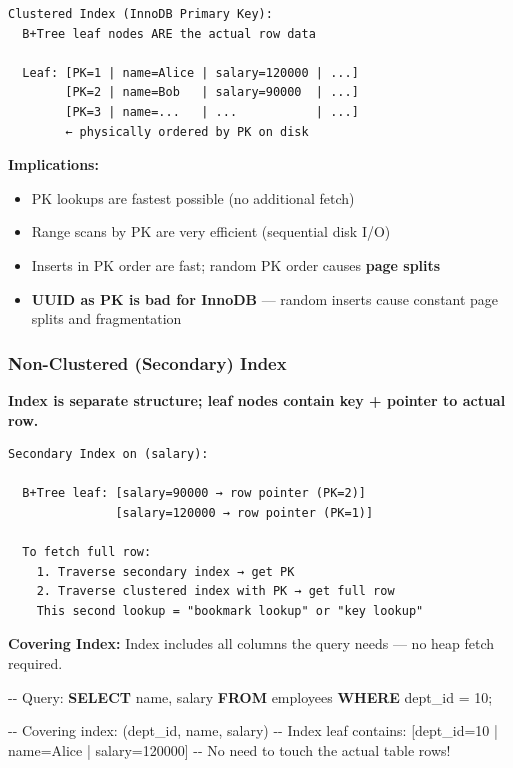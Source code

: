 \documentclass[11pt]{article}
\providecommand{\tightlist}{\setlength{\itemsep}{1pt}\setlength{\parskip}{0pt}}
\newenvironment{Shaded}{\begin{snugshade}}{\end{snugshade}}
\newcommand{\CommentTok}[1]{\textcolor[rgb]{0.48,0.49,0.49}{#1}}
\newcommand{\DecValTok}[1]{\textcolor[rgb]{0.96,0.45,0.00}{#1}}
\newcommand{\KeywordTok}[1]{\textcolor[rgb]{0.81,0.81,0.76}{\textbf{#1}}}
\newcommand{\NormalTok}[1]{\textcolor[rgb]{0.81,0.81,0.76}{#1}}
\newcommand{\OperatorTok}[1]{\textcolor[rgb]{0.81,0.81,0.76}{#1}}
\begin{document}
\setcodelang{}

\begin{verbatim}
Clustered Index (InnoDB Primary Key):
  B+Tree leaf nodes ARE the actual row data

  Leaf: [PK=1 | name=Alice | salary=120000 | ...]
        [PK=2 | name=Bob   | salary=90000  | ...]
        [PK=3 | name=...   | ...           | ...]
        ← physically ordered by PK on disk
\end{verbatim}

\textbf{Implications:}

\begin{itemize}
\tightlist
\item
  PK lookups are fastest possible (no additional fetch)
\item
  Range scans by PK are very efficient (sequential disk I/O)
\item
  Inserts in PK order are fast; random PK order causes \textbf{page splits}
\item
  \textbf{UUID as PK is bad for InnoDB} --- random inserts cause constant page splits and fragmentation
\end{itemize}

\subsubsection{Non-Clustered (Secondary) Index}\label{non-clustered-secondary-index}

\textbf{Index is separate structure; leaf nodes contain key + pointer to actual row.}

\setcodelang{}

\begin{verbatim}
Secondary Index on (salary):

  B+Tree leaf: [salary=90000 → row pointer (PK=2)]
               [salary=120000 → row pointer (PK=1)]

  To fetch full row:
    1. Traverse secondary index → get PK
    2. Traverse clustered index with PK → get full row
    This second lookup = "bookmark lookup" or "key lookup"
\end{verbatim}

\textbf{Covering Index:} Index includes all columns the query needs --- no heap fetch required.


\begin{Shaded}
\begin{Highlighting}[]
\CommentTok{{-}{-} Query:}
\KeywordTok{SELECT}\NormalTok{ name, salary }\KeywordTok{FROM}\NormalTok{ employees }\KeywordTok{WHERE}\NormalTok{ dept\_id }\OperatorTok{=} \DecValTok{10}\NormalTok{;}

\CommentTok{{-}{-} Covering index: (dept\_id, name, salary)}
\CommentTok{{-}{-} Index leaf contains: [dept\_id=10 | name=Alice | salary=120000]}
\CommentTok{{-}{-} No need to touch the actual table rows!}
\end{Highlighting}
\end{Shaded}
\end{document}
